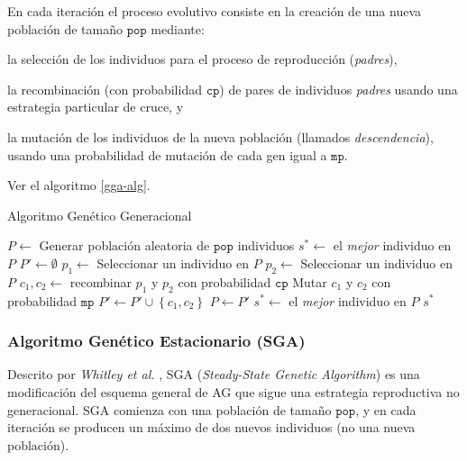 En cada iteración el proceso evolutivo consiste en la creación de una nueva población de tamaño $\texttt{pop}$ mediante:
\begin{inparaenum}
\item la selección de los individuos para el proceso de reproducción (\emph{padres}),
\item la recombinación (con probabilidad $\texttt{cp}$) de pares de individuos \emph{padres} usando una estrategia particular de cruce, y
\item la mutación de los individuos de la nueva población (llamados \emph{descendencia}), usando una probabilidad de mutación de cada gen igual a $\texttt{mp}$.
\end{inparaenum}
Ver el algoritmo \ref{gga-alg}.

\begin{algorithm}
\caption{Algoritmo Genético Generacional}
\label{gga-alg}
\begin{algorithmic}[1]


\State $P \gets$ Generar población aleatoria de $\texttt{pop}$ individuos
\State $s^* \gets $ el \emph{mejor} individuo en $P$
	\State $P' \gets \emptyset$
		\State $p_1 \gets$ Seleccionar un individuo en $P$
		\State $p_2 \gets$ Seleccionar un individuo en $P$
		\State $c_1, c_2 \gets $ recombinar $p_1$ y $p_2$ con probabilidad $\texttt{cp}$
		\State Mutar $c_1$ y $c_2$ con probabilidad $\texttt{mp}$
		\State $P' \gets P' \cup \left\lbrace c_1, c_2 \right\rbrace$
	\EndWhile
	\State $P \gets P'$
		\State $s^* \gets$ el \emph{mejor} individuo en $P$
	\EndIf
\EndWhile
\State \Return $s^*$

\end{algorithmic}
\end{algorithm}

\subsubsection{Algoritmo Genético Estacionario (SGA)}

Descrito por \emph{Whitley et al.} \cite{whitley1988genitor}, SGA (\emph{Steady-State Genetic Algorithm}) es una modificación del esquema general de AG que sigue una estrategia reproductiva no generacional. SGA comienza con una población de tamaño $\texttt{pop}$, y en cada iteración se producen un máximo de dos nuevos individuos (no una nueva población).

